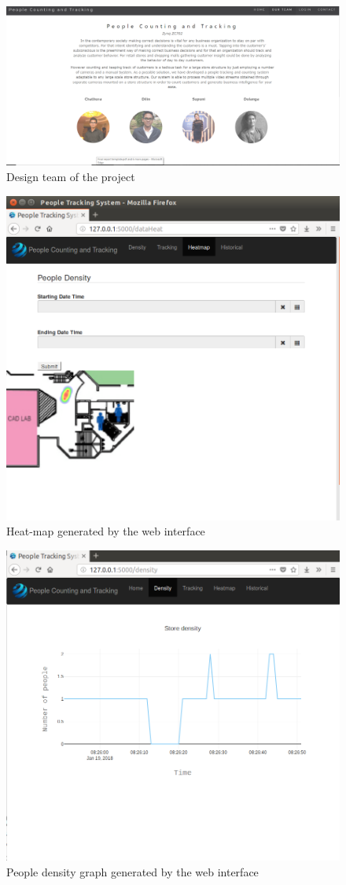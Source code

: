 \documentclass[12pt,a4paper]{report}
\begin{document}
\begin{figure}[H]
  \centering
  \includegraphics[width=.8\linewidth]{Capture}
  \caption{Design team of the project}
  \label{web:4}
\end{figure}

\begin{figure}[H]
  \centering
  \includegraphics[width=.6\linewidth]{heatmap}
  \caption{Heat-map generated by the web interface}
  \label{graph1}
\end{figure}
\begin{figure}[H]
  \centering
  \includegraphics[width=.6\linewidth]{density}
  \caption{People density graph generated by the web interface}
  \label{graph2}
\end{figure}
\newpage
\end{document}
